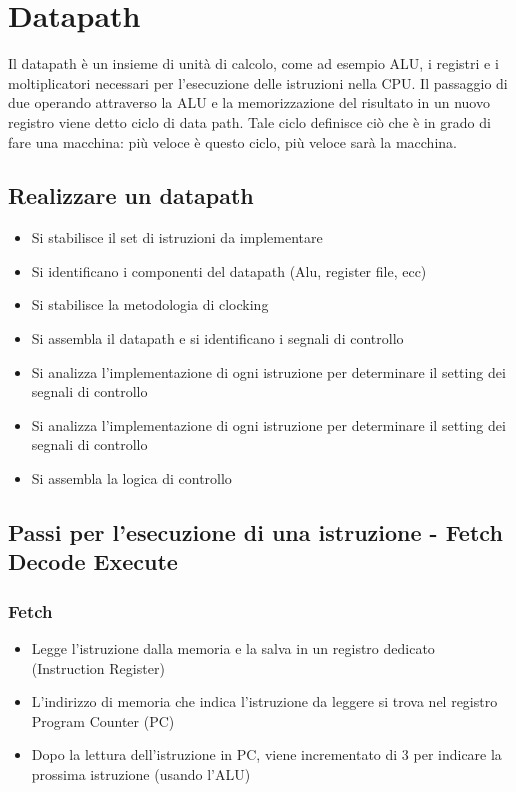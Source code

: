 \documentclass[12pt, a4paper, openany]{book}
\begin{document}
\chapter{Datapath}
Il datapath è un insieme di unità di calcolo, come ad esempio
ALU, i registri e i moltiplicatori necessari per l'esecuzione delle istruzioni nella
CPU.
Il passaggio di due operando attraverso la ALU e la memorizzazione del risultato in un
nuovo registro viene detto ciclo di data path. Tale ciclo definisce ciò che è in grado
di fare una macchina: più veloce è questo ciclo, più veloce sarà la macchina.

\section{Realizzare un datapath}
\begin{itemize}
    \item Si stabilisce il set di istruzioni da implementare
    \item Si identificano i componenti del datapath (Alu, register file, ecc)
    \item Si stabilisce la metodologia di clocking
    \item Si assembla il datapath e si identificano i segnali di controllo
    \item Si analizza l'implementazione di ogni istruzione per determinare il setting
    dei segnali di controllo
    \item Si analizza l'implementazione di ogni istruzione per determinare il setting
    dei segnali di controllo
    \item Si assembla la logica di controllo
\end{itemize}

\section{Passi per l'esecuzione di una istruzione - Fetch Decode Execute}
\subsection*{Fetch} \begin{itemize}
    \item Legge l'istruzione dalla memoria e la salva in un registro dedicato
    (Instruction Register)
    \item L'indirizzo di memoria che indica l'istruzione da leggere si trova nel registro
    Program Counter (PC)
    \item Dopo la lettura dell'istruzione in PC, viene incrementato di 3 per indicare la
    prossima istruzione (usando l'ALU)
\end{itemize}
\end{document}

